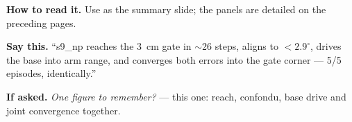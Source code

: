 \documentclass[11pt]{article}
\begin{document}
\textbf{How to read it.} Use as the summary slide; the panels are detailed on the preceding pages.

\textbf{Say this.} ``s9\_np reaches the 3~cm gate in $\sim$26 steps, aligns to $<2.9^\circ$, drives the base into arm range, and converges both errors into the gate corner --- 5/5 episodes, identically.''

\textbf{If asked.} \emph{One figure to remember?} --- this one: reach, confondu, base drive and joint convergence together.
\clearpage
\end{document}
